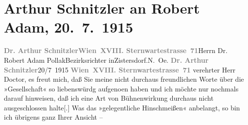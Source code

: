 

         
         \renewcommand{\erwaehntePersonen}{Personen: Robert Adam}
         \renewcommand{\erwaehnteOrte}{Orte: Niederösterreich, Sternwartestraße, Wien, XVIII., Währing, Zistersdorf}
         \renewcommand{\erwaehnteWerke}{Werke: Gesellschaft [Eine Gaunerkomödie], Rechtsphilosophie}
               \section[Arthur Schnitzler an Robert Adam, 20. 7. 1915]{ Arthur Schnitzler an Robert Adam, 20. 7. 1915}\nopagebreak{}\rehead{ }\begin{ledgroupsized}[t]{13cm}\normalsize\beginnumbering \toendnotes[C]{\smallbreak\pagebreak[2]} 
\pstart{}{\pb}\textcolor{gray}{\textbf{Dr. Arthur Schnitzler}}\pend{}\pstart{}\textcolor{gray}{\textbf{Wien XVIII. Sternwartestrasse 71}}\pend{}{\bigskip}\pstart{}{\pb}Herrn Dr. Robert Adam
                        Pollak\pend{}\pstart{}Bezirksrichter in\pend{}\pstart{}Zistersdorf.\pend{}\pstart{}N. Oe.\pend{}{\bigskip}\pstart
           \noindent{}{\pb}\textcolor{gray}{\textbf{Dr. Arthur Schnitzler}}\hfill 20/7 1915\pend
           \pstart
           \textcolor{gray}{\textbf{Wien XVIII. Sternwartestrasse 71}}\pend
           \pstart
           verehrter Herr Doctor, es freut mich, daß Sie meine nicht
                    durchaus freundlichen Worte über die »Gesellschaft« so liebenswürdg aufgeno{\geminationm}en
                    haben und ich möchte nur nochmals darauf hinweisen, daß ich eine Art von
                    Bühnenwirkung durchaus nicht ausgeschlossen halte{[}.{]} Was das
                    »gelegentliche Hinschmeißen« anbelangt, so bin ich übrigens ganz Ihrer Ansicht –

\end{ledgroupsized}
